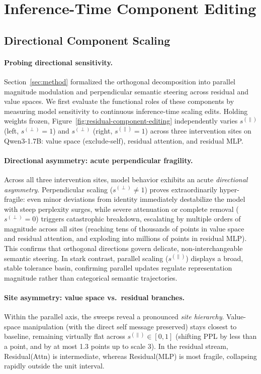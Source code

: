 \section{Inference-Time Component Editing}
\label{sec:editing-diagnostics}

\subsection{Directional Component Scaling}
\label{sec:zeroshot}

\paragraph{Probing directional sensitivity.}
Section~\ref{sec:method} formalized the orthogonal decomposition into parallel
magnitude modulation and perpendicular semantic steering across residual and
value spaces. We first evaluate the functional roles of these components by
measuring model sensitivity to continuous inference-time scaling edits.
Holding weights frozen, Figure~\ref{fig:residual-component-editing} independently
varies $s^{(\parallel)}$ (left, $s^{(\perp)}=1$) and $s^{(\perp)}$ (right,
$s^{(\parallel)}=1$) across three intervention sites on Qwen3-1.7B:
value space (exclude-self), residual attention, and residual MLP.

\paragraph{Directional asymmetry: acute perpendicular fragility.}
Across all three intervention sites, model behavior exhibits an acute
\textit{directional asymmetry}. Perpendicular scaling ($s^{(\perp)} \ne 1$)
proves extraordinarily hyper-fragile: even minor deviations from identity
immediately destabilize the model with steep perplexity surges, while severe
attenuation or complete removal ($s^{(\perp)}=0$) triggers catastrophic
breakdown, escalating by multiple orders of magnitude across all sites (reaching
tens of thousands of points in value space and residual attention, and exploding
into millions of points in residual MLP). This confirms that orthogonal
directions govern delicate, non-interchangeable semantic steering. In stark
contrast, parallel scaling ($s^{(\parallel)}$) displays a broad, stable tolerance
basin, confirming parallel updates regulate representation magnitude
rather than categorical semantic trajectories.

\paragraph{Site asymmetry: value space vs.\ residual branches.}
Within the parallel axis, the sweeps reveal a pronounced \textit{site
hierarchy}. Value-space manipulation (with the direct self message preserved)
stays closest to baseline, remaining virtually flat across
$s^{(\parallel)} \in [0, 1]$ (shifting PPL by less than a point, and by at most
1.3 points up to scale 3). In the residual stream, Residual(Attn) is
intermediate, whereas Residual(MLP) is most fragile, collapsing rapidly
outside the unit interval.


